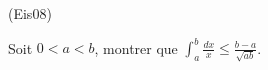 \begin{tiny}(Eis08)\end{tiny}
Soit $0<a<b$, montrer que $\int_{a}^{b}\frac{dx}{x}\leq \frac{b-a}{\sqrt{ab}}$.